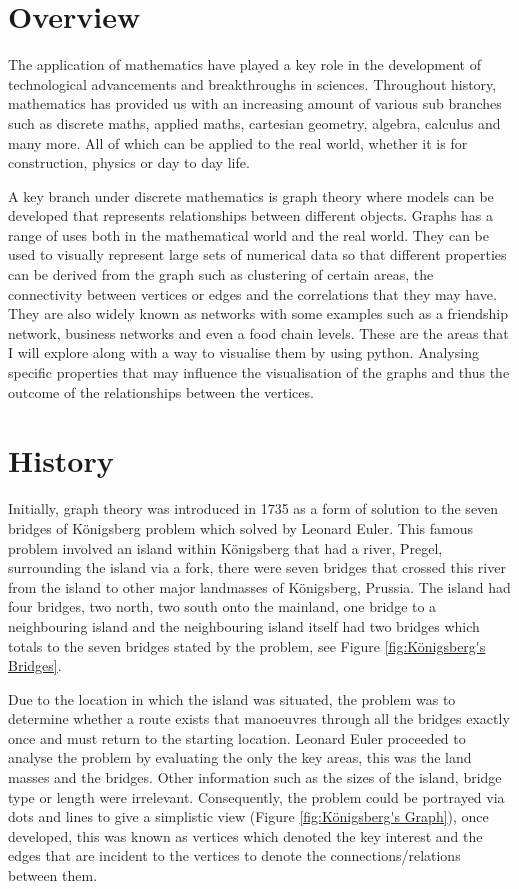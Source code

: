 \section{Overview}
The application of mathematics have played a key role in the development of technological advancements and breakthroughs in sciences. Throughout history, mathematics has provided us with an increasing amount of various sub branches such as discrete maths, applied maths, cartesian geometry, algebra, calculus and many more. All of which can be applied to the real world, whether it is for construction, physics or day to day life. 

A key branch under discrete mathematics is graph theory where models can be developed that represents relationships between different objects. Graphs has a range of uses both in the mathematical world and the real world. They can be used to visually represent large sets of numerical data so that different properties can be derived from the graph such as clustering of certain areas, the connectivity between vertices or edges and the correlations that they may have. They are also widely known as networks with some examples such as a friendship network, business networks and even a food chain levels. These are the areas that I will explore along with a way to visualise them by using python. Analysing specific properties that may influence the visualisation of the graphs and thus the outcome of the relationships between the vertices.

\section{History}
Initially, graph theory was introduced in 1735 as a form of solution to the seven bridges of Königsberg problem which solved by Leonard Euler\cite{POWELL20151}. This famous problem involved an island within Königsberg that had a river, Pregel, surrounding the island via a fork, there were seven bridges that crossed this river from the island to other major landmasses of Königsberg, Prussia. The island had four bridges, two north, two south onto the mainland, one bridge to a neighbouring island and the neighbouring island itself had two bridges which totals to the seven bridges stated by the problem, see Figure \ref{fig:Königsberg's Bridges}. 

Due to the location in which the island was situated, the problem was to determine whether a route exists that manoeuvres through all the bridges exactly once and must return to the starting location. Leonard Euler proceeded to analyse the problem by evaluating the only the key areas, this was the land masses and the bridges. Other information such as the sizes of the island, bridge type or length were irrelevant. Consequently, the problem could be portrayed via dots and lines to give a simplistic view (Figure \ref{fig:Königsberg's Graph}), once developed, this was known as vertices which denoted the key interest and the edges that are incident to the vertices to denote the connections/relations between them. 

